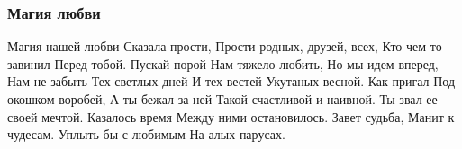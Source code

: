  
 
 

\subsubsection{Магия любви}
\label{sec:poetry.rus.olesja_gavryshko.magija_lubvi}

Магия нашей любви
Сказала прости,
Прости родных, друзей, всех,
Кто чем то завинил
Перед тобой.
Пускай порой
Нам тяжело любить,
Но мы идем вперед,
Нам не забыть
Тех светлых дней
И тех вестей
Укутаных весной.
Как пригал
Под окошком воробей,
А ты бежал за ней
Такой счастливой и наивной.
Ты звал ее своей мечтой.
Казалось время
Между ними остановилось.
Завет судьба,
Манит к чудесам.
Уплыть бы с любимым
На алых парусах.
